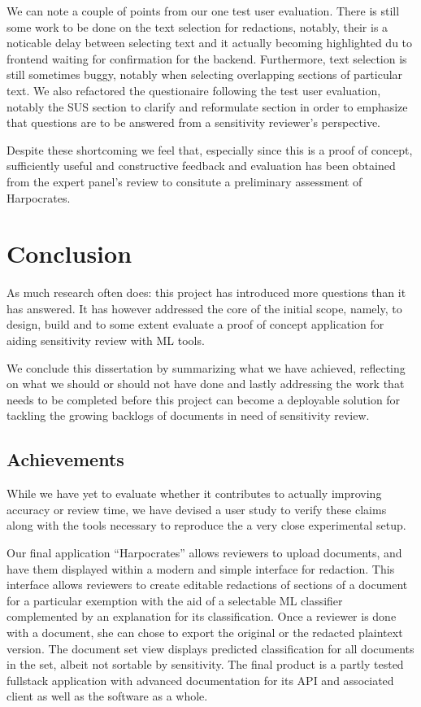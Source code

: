 \documentclass[\version]{l4proj}
\begin{document}
We can note a couple of points from our one test user evaluation.
There is still some work to be done on the text selection for redactions, notably, their is a noticable delay between selecting text and it actually becoming highlighted du to frontend waiting for confirmation for the backend.
Furthermore, text selection is still sometimes buggy, notably when selecting overlapping sections of particular text.
We also refactored the questionaire following the test user evaluation, notably the SUS section to clarify and reformulate section in order to emphasize that questions are to be answered from a sensitivity reviewer's perspective.

Despite these shortcoming we feel that, especially since this is a proof of concept, sufficiently useful and constructive feedback and evaluation has been obtained from the expert panel's review to consitute a preliminary assessment of Harpocrates.



\chapter{Conclusion}

As much research often does: this project has introduced more questions than it has answered.
It has however addressed the core of the initial scope, namely, to design, build and to some extent evaluate a proof of concept application for aiding sensitivity review with ML tools.

We conclude this dissertation by summarizing what we have achieved, reflecting on what we should or should not have done and lastly addressing the work that needs to be completed before this project can become a deployable solution for tackling the growing backlogs of documents in need of sensitivity review.

\section{Achievements}

While we have yet to evaluate whether it contributes to actually improving accuracy or review time, we have devised a user study to verify these claims along with the tools necessary to reproduce the a very close experimental setup.

Our final application ``Harpocrates'' allows reviewers to upload documents, and have them displayed within a modern and simple interface for redaction.
This interface allows reviewers to create editable redactions of sections of a document for a particular exemption with the aid of a selectable ML classifier complemented by an explanation for its classification.
Once a reviewer is done with a document, she can chose to export the original or the redacted plaintext version.
The document set view displays predicted classification for all documents in the set, albeit not sortable by sensitivity.
The final product is a partly tested fullstack application with advanced documentation for its API and associated client as well as the software as a whole.
\end{document}
